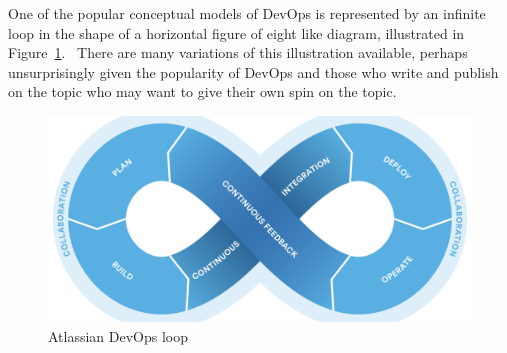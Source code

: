 One of the popular conceptual models of DevOps is represented by an infinite loop in the shape of a horizontal figure of eight like diagram, illustrated in Figure~\ref{fig:atlassian-state-of-devops-report-2016-devopsloop}.~ There are many variations of this illustration available, perhaps unsurprisingly given the popularity of DevOps and those who write and publish on the topic who may want to give their own spin on the topic.

\begin{figure}
    \includegraphics[width=0.8\linewidth]{images/atlassian/atlassian-state-of-devops-report-2016-devopsloop.pdf}
    \caption{Atlassian DevOps loop}
    \label{fig:atlassian-state-of-devops-report-2016-devopsloop}
\end{figure}


